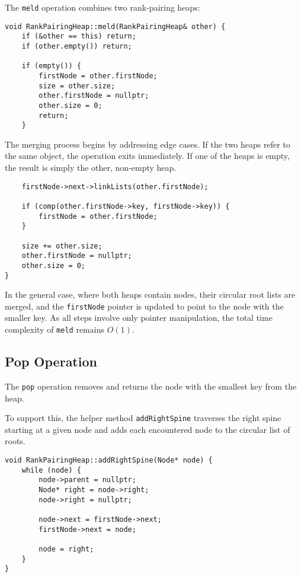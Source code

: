The \texttt{meld} operation combines two rank-pairing heaps:

\begin{verbatim}
void RankPairingHeap::meld(RankPairingHeap& other) {
    if (&other == this) return;
    if (other.empty()) return;

    if (empty()) {
        firstNode = other.firstNode;
        size = other.size;
        other.firstNode = nullptr;
        other.size = 0;
        return;
    }
\end{verbatim}

The merging process begins by addressing edge cases. If the two heaps refer to the same object, the operation exits immediately. If one of the heaps is empty, the result is simply the other, non-empty heap.

\begin{verbatim}
    firstNode->next->linkLists(other.firstNode);

    if (comp(other.firstNode->key, firstNode->key)) {
        firstNode = other.firstNode;
    }

    size += other.size;
    other.firstNode = nullptr;
    other.size = 0;
}
\end{verbatim}

In the general case, where both heaps contain nodes, their circular root lists are merged, and the \texttt{firstNode} pointer is updated to point to the node with the smaller key. As all steps involve only pointer manipulation, the total time complexity of \texttt{meld} remains \(O(1)\).

\subsection{Pop Operation}

The \texttt{pop} operation removes and returns the node with the smallest key from the heap.

To support this, the helper method \texttt{addRightSpine} traverses the right spine starting at a given node and adds each encountered node to the circular list of roots.

\begin{verbatim}
void RankPairingHeap::addRightSpine(Node* node) {
    while (node) {
        node->parent = nullptr;
        Node* right = node->right;
        node->right = nullptr;
        
        node->next = firstNode->next;
        firstNode->next = node;
        
        node = right;
    }
}
\end{verbatim}

